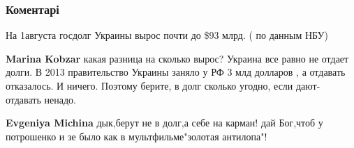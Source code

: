  
 
 
 
 
\subsubsection{Коментарі}
\label{sec:01_09_2021.fb.murajev_jevgenij.1.mogilnik_westingauz.cmt}

\begin{itemize}
 
На 1августа госдолг Украины вырос почти до \$93 млрд. ( по данным НБУ)

\begin{itemize}
 
\textbf{Marina Kobzar} какая разница на сколько вырос? Украина все равно не отдает долги. В 2013 правительство Украины заняло у РФ 3 млд долларов , а отдавать отказалось. И ничего.
Поэтому берите, в долг сколько угодно, если дают- отдавать ненадо.

 
\textbf{Evgeniya Michina} дык,берут не в долг,а себе на карман! дай Бог,чтоб у потрошенко и зе было как в мультфильме"золотая антилопа"!

 

\end{itemize}
\end{itemize}
